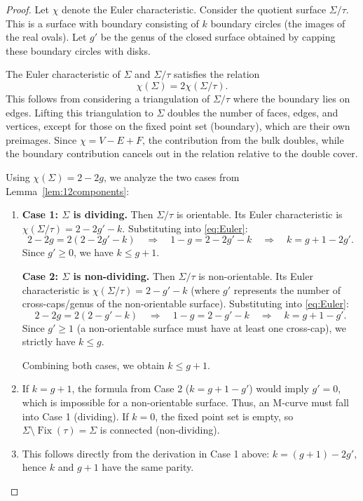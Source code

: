 \documentclass[11pt,a4paper]{article}
\theoremstyle{definition}
\DeclareMathOperator{\fix}{\mathrm{Fix}}
\begin{document}
\begin{proof}
	Let $\chi$ denote the Euler characteristic. Consider the quotient surface $\Sigma/\tau$. This is a surface with boundary consisting of $k$ boundary circles (the images of the real ovals). Let $g'$ be the genus of the closed surface obtained by capping these boundary circles with disks.
	
	The Euler characteristic of $\Sigma$ and $\Sigma/\tau$ satisfies the relation
	\begin{equation}\label{eq:Euler}
		\chi(\Sigma) = 2 \chi(\Sigma/\tau).
	\end{equation}
	This follows from considering a triangulation of $\Sigma/\tau$ where the boundary lies on edges. Lifting this triangulation to $\Sigma$ doubles the number of faces, edges, and vertices, except for those on the fixed point set (boundary), which are their own preimages. Since $\chi = V - E + F$, the contribution from the bulk doubles, while the boundary contribution cancels out in the relation relative to the double cover.
	
	Using $\chi(\Sigma) = 2 - 2g$, we analyze the two cases from Lemma~\ref{lem:12components}:
	
	\begin{enumerate}
		\item[(i)]
		\textbf{Case 1: $\Sigma$ is dividing.} Then $\Sigma/\tau$ is orientable. Its Euler characteristic is $\chi(\Sigma/\tau) = 2 - 2g' - k$. Substituting into \eqref{eq:Euler}:
		\[
		2 - 2g = 2(2 - 2g' - k) \quad \Rightarrow \quad 1 - g = 2 - 2g' - k \quad \Rightarrow \quad k = g + 1 - 2g'.
		\]
		Since $g' \geq 0$, we have $k \leq g + 1$.
		
		\textbf{Case 2: $\Sigma$ is non-dividing.} Then $\Sigma/\tau$ is non-orientable. Its Euler characteristic is $\chi(\Sigma/\tau) = 2 - g' - k$ (where $g'$ represents the number of cross-caps/genus of the non-orientable surface). Substituting into \eqref{eq:Euler}:
		\[
		2 - 2g = 2(2 - g' - k) \quad \Rightarrow \quad 1 - g = 2 - g' - k \quad \Rightarrow \quad k = g + 1 - g'.
		\]
		Since $g' \geq 1$ (a non-orientable surface must have at least one cross-cap), we strictly have $k \leq g$.
		
		Combining both cases, we obtain $k \leq g + 1$.
		
		\item[(ii)] If $k = g + 1$, the formula from Case 2 ($k = g + 1 - g'$) would imply $g' = 0$, which is impossible for a non-orientable surface. Thus, an M-curve must fall into Case 1 (dividing).
		If $k = 0$, the fixed point set is empty, so $\Sigma \setminus \fix(\tau) = \Sigma$ is connected (non-dividing).
		
		\item[(iii)] This follows directly from the derivation in Case 1 above: $k = (g+1) - 2g'$, hence $k$ and $g+1$ have the same parity.
	\end{enumerate}
\end{proof}
\end{document}

